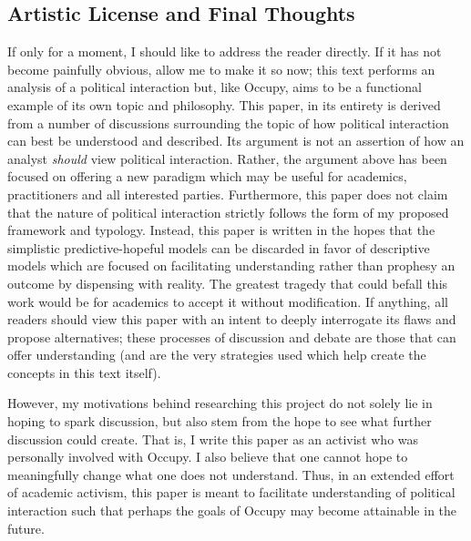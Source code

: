 \documentclass[openany,twoside]{memoir}
\begin{document}
\begin{Spacing}{2}
\section{Artistic License and Final Thoughts}
If only for a moment, I should like to address the reader directly.
If it has not become painfully obvious, allow me to make it so now; this text performs an analysis of a political interaction but, like Occupy, aims to be a functional example of its own topic and philosophy.
This paper, in its entirety is derived from a number of discussions surrounding the topic of how political interaction can best be understood and described.
Its argument is not an assertion of how an analyst \emph{should} view political interaction.
Rather, the argument above has been focused on offering a new paradigm which may be useful for academics, practitioners and all interested parties.
Furthermore, this paper does not claim that the nature of political interaction strictly follows the form of my proposed framework and typology.
Instead, this paper is written in the hopes that the simplistic predictive-hopeful models can be discarded in favor of descriptive models which are focused on facilitating understanding rather than prophesy an outcome by dispensing with reality.
The greatest tragedy that could befall this work would be for academics to accept it without modification.
If anything, all readers should view this paper with an intent to deeply interrogate its flaws and propose alternatives; these processes of discussion and debate are those that can offer understanding (and are the very strategies used which help create the concepts in this text itself).

However, my motivations behind researching this project do not solely lie in hoping to spark discussion, but also stem from the hope to see what further discussion could create.
That is, I write this paper as an activist who was personally involved with Occupy.
I also believe that one cannot hope to meaningfully change what one does not understand.
Thus, in an extended effort of academic activism, this paper is meant to facilitate understanding of political interaction such that perhaps the goals of Occupy may become attainable in the future.

\newpage
\printbibliography
\end{Spacing}
\end{document}
